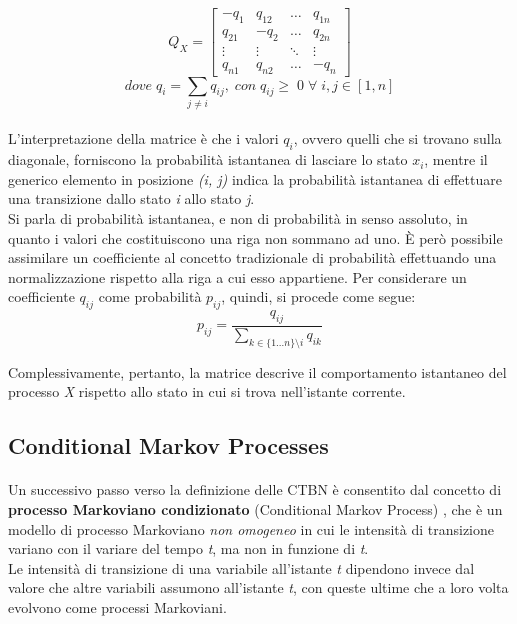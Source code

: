   \[
    Q_X = 
    \begin{bmatrix}
      -q_1 & q_{12} & \dots & q_{1n}\\
      q_{21} & -q_2 & \dots & q_{2n}\\
      \vdots & \vdots & \ddots & \vdots\\
      q_{n1} & q_{n2} & \dots & -q_n
    \end{bmatrix} 
  \]
  \[
    dove \; q_i = \sum_{j \neq i} q_{ij}, \; con \; q_{ij} \geq \; 0 \; \forall \; i, j \in [1, n]
  \]

  \paragraph{}
  L'interpretazione della matrice è che i valori \textit{$q_i$}, ovvero quelli che si trovano sulla
  diagonale, forniscono la probabilità istantanea di lasciare lo stato \textit{$x_i$}, mentre il generico
  elemento in posizione \textit{(i, j)} indica la probabilità istantanea di effettuare una transizione dallo stato \textit{i} allo stato \textit{j}.\\
  Si parla di probabilità istantanea, e non di probabilità in senso assoluto, in quanto 
  i valori che costituiscono una riga non sommano ad uno. È però possibile assimilare un coefficiente al concetto tradizionale di probabilità
  effettuando una normalizzazione rispetto alla riga a cui esso appartiene. Per considerare un
  coefficiente $q_{ij}$ come probabilità $p_{ij}$, quindi, si procede come segue:
  \begin{equation}
    p_{ij} = \frac{q_{ij}}{\sum_{k \in \{1...n\} \setminus i}q_{ik}}
  \end{equation}

  Complessivamente, pertanto, la matrice descrive il comportamento istantaneo del processo \textit{X} rispetto
  allo stato in cui si trova nell'istante corrente.

  \subsection{Conditional Markov Processes}
  \paragraph{}
  Un successivo passo verso la definizione delle CTBN è consentito dal concetto di \textbf{processo Markoviano condizionato} (Conditional Markov Process) \cite{nodelman-2007},
  che è un modello di processo Markoviano \textit{non omogeneo} in cui le intensità di transizione
  variano con il variare del tempo \textit{t}, ma non in funzione di \textit{t}.\\
  Le intensità di transizione di una variabile all'istante \textit{t} dipendono invece dal valore che 
  altre variabili assumono all'istante \textit{t}, con queste ultime che a loro volta evolvono come processi Markoviani.
  
